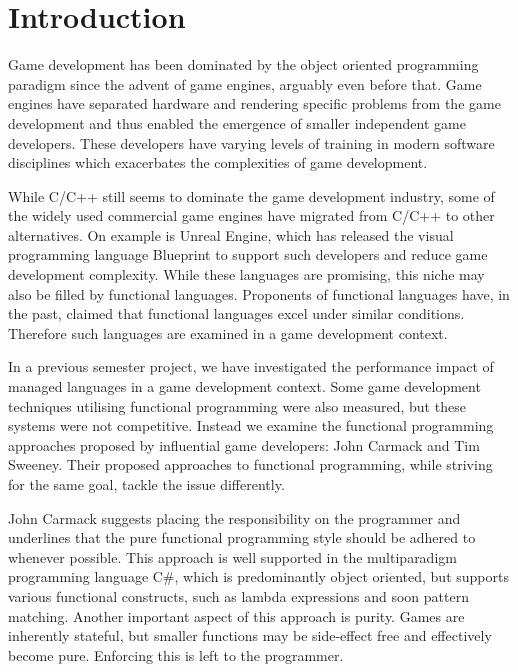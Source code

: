 \chapter{Introduction} \label{chap:introduction}
Game development has been dominated by the object oriented programming paradigm since the advent of game engines\cite{anderson@2011:scripting-classes}, arguably even before that. Game engines have separated hardware and rendering specific problems from the game development and thus enabled the emergence of smaller independent game developers\cite{michael2003indie}. These developers have varying levels of training in modern software disciplines\cite{mcgill2009defining, hewner2010game} which exacerbates the complexities of game development\cite{blow2004game}.

While C/C++ still seems to dominate the game development industry\cite{wikipedia:list:of:game:engines}, some of the widely used commercial game engines have migrated from C/C++ to other alternatives. On example is Unreal Engine, which has released the visual programming language Blueprint\cite{unreal:blueprint:intro} to support such developers and reduce game development complexity\cite{unreal:blueprint:overview}. While these languages are promising, this niche may also be filled by functional languages. Proponents of functional languages have, in the past, claimed that functional languages excel under similar conditions\cite{kemerer2009impact, hughes1989functional, hu2015functional}. Therefore such languages are examined in a game development context.  

In a previous semester project, we have investigated the performance impact of managed languages in a game development context\cite{p92018gameplay}. Some game development techniques utilising functional programming were also measured, but these systems were not competitive. Instead we examine the functional programming approaches proposed by influential game developers: John Carmack and Tim Sweeney. Their proposed approaches to functional programming, while striving for the same goal, tackle the issue differently.


John Carmack suggests placing the responsibility on the programmer and underlines that the pure functional programming style should be adhered to whenever possible\cite{gamasutra:c++functional}. This approach is well supported in the multiparadigm programming language C\#, which is predominantly object oriented, but supports various functional constructs, such as lambda expressions\cite{csharp:lambda} and soon pattern matching\cite{csharp:pattern:matching}. Another important aspect of this approach is purity. Games are inherently stateful\cite{games:stateful}, but smaller functions may be side-effect free and effectively become pure. Enforcing this is left to the programmer.

